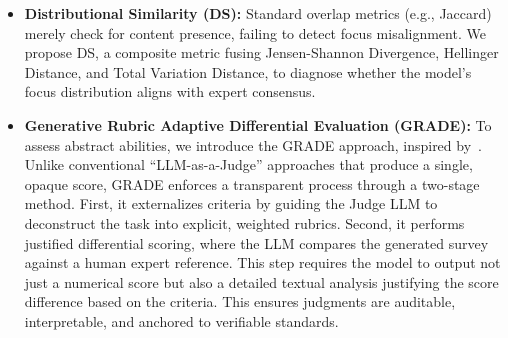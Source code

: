 \documentclass[11pt]{article}
\begin{document}
\begin{itemize}[leftmargin=0.2cm, itemsep=0pt, parsep=0pt]
    \item \textbf{Distributional Similarity (DS):} Standard overlap metrics (e.g., Jaccard) merely check for content presence, failing to detect focus misalignment. We propose DS, a composite metric fusing Jensen-Shannon Divergence, Hellinger Distance, and Total Variation Distance, to diagnose whether the model's focus distribution aligns with expert consensus.

    \item \textbf{Generative Rubric Adaptive Differential Evaluation (GRADE):} To assess abstract abilities, we introduce the GRADE approach, inspired by~\cite{du2025deepresearch}. Unlike conventional ``LLM-as-a-Judge'' approaches that produce a single, opaque score, GRADE enforces a transparent process through a two-stage method. First, it externalizes criteria by guiding the Judge LLM to deconstruct the task into explicit, weighted rubrics. Second, it performs justified differential scoring, where the LLM compares the generated survey against a human expert reference. This step requires the model to output not just a numerical score but also a detailed textual analysis justifying the score difference based on the criteria. This ensures judgments are auditable, interpretable, and anchored to verifiable standards.
\end{itemize}
\end{document}
